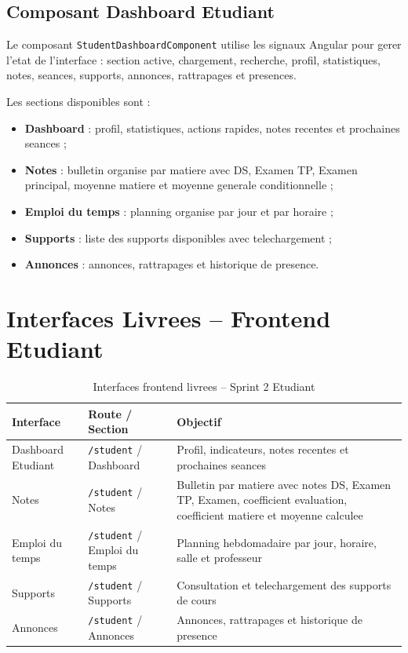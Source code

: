 \documentclass[12pt,a4paper]{report}
\begin{document}
\subsection{Composant Dashboard Etudiant}

Le composant \texttt{StudentDashboardComponent} utilise les signaux Angular pour gerer l'etat de l'interface : section active, chargement, recherche, profil, statistiques, notes, seances, supports, annonces, rattrapages et presences.

Les sections disponibles sont :

\begin{itemize}[itemsep=0.3em]
    \item \textbf{Dashboard} : profil, statistiques, actions rapides, notes recentes et prochaines seances ;
    \item \textbf{Notes} : bulletin organise par matiere avec DS, Examen TP, Examen principal, moyenne matiere et moyenne generale conditionnelle ;
    \item \textbf{Emploi du temps} : planning organise par jour et par horaire ;
    \item \textbf{Supports} : liste des supports disponibles avec telechargement ;
    \item \textbf{Annonces} : annonces, rattrapages et historique de presence.
\end{itemize}

\section{Interfaces Livrees -- Frontend Etudiant}

\begin{table}[H]
\centering
\caption{Interfaces frontend livrees -- Sprint 2 Etudiant}
\begin{tabular}{|p{4cm}|p{4cm}|p{5cm}|}
\hline
\textbf{Interface} & \textbf{Route / Section} & \textbf{Objectif} \\
\hline
Dashboard Etudiant & \texttt{/student} / Dashboard & Profil, indicateurs, notes recentes et prochaines seances \\
\hline
Notes & \texttt{/student} / Notes & Bulletin par matiere avec notes DS, Examen TP, Examen, coefficient evaluation, coefficient matiere et moyenne calculee \\
\hline
Emploi du temps & \texttt{/student} / Emploi du temps & Planning hebdomadaire par jour, horaire, salle et professeur \\
\hline
Supports & \texttt{/student} / Supports & Consultation et telechargement des supports de cours \\
\hline
Annonces & \texttt{/student} / Annonces & Annonces, rattrapages et historique de presence \\
\hline
\end{tabular}
\end{table}
\end{document}
